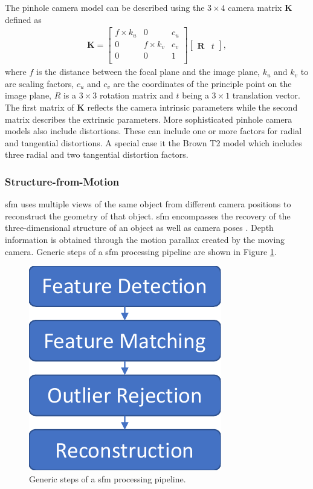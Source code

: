The pinhole camera model can be described using the $3\times4$ camera matrix $\textbf{K}$ defined as
\begin{align}
    \textbf{K} = \begin{bmatrix}
        f\times k_u & 0           & c_u \\
        0           & f\times k_v & c_v \\
        0           & 0           & 1   \\
    \end{bmatrix} 
    \begin{bmatrix}
        \textbf{R} & t
    \end{bmatrix}, \label{eq:camera_m}
\end{align}
where $f$ is the distance between the focal plane and the image plane, $k_u$ and $k_v$ to are scaling factors, $c_u$ and $c_v$ are the coordinates of the principle point on the image plane, $R$ is a $3\times3$ rotation matrix and $t$ being a $3\times1$ translation vector. The first matrix of $\textbf{K}$ reflects the camera intrinsic parameters while the second matrix describes the extrinsic parameters.
More sophisticated pinhole camera models also include distortions. These can include one or more factors for radial and tangential distortions. A special case it the Brown T2 model which includes three radial and two tangential distortion factors.

\subsubsection{Structure-from-Motion}
\gls{sfm} uses multiple views of the same object from different camera positions to reconstruct the geometry of that object. \Gls{sfm} encompasses the recovery of the three-dimensional structure of an object as well as camera poses \cite{szeliski2010computer}. Depth information is obtained through the motion parallax created by the moving camera. Generic steps of a \gls{sfm} processing pipeline are shown in Figure \ref{fig:sfm_steps}.

\begin{figure}[htb]
    \centering
    \includegraphics[width=.25\textwidth]{doc/thesis/0_figures/sfm/SfM.pdf}
    \caption{Generic steps of a \gls{sfm} processing pipeline.}
    \label{fig:sfm_steps}
\end{figure}

